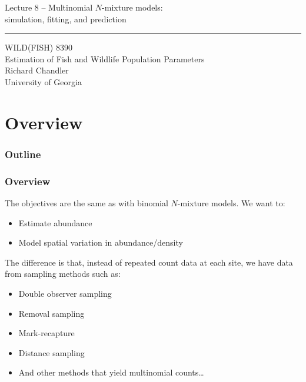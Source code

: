 \documentclass[color=usenames,dvipsnames]{beamer}\usepackage[]{graphicx}\usepackage[]{color}
\begin{document}
\begin{frame}[plain]
  \LARGE
  \centering
  {\LARGE Lecture 8 -- Multinomial $N$-mixture models: \\ simulation, fitting, and prediction} \\
  {\color{default} \rule{\textwidth}{0.1pt}}
  \vfill
  \large
  WILD(FISH) 8390 \\
  Estimation of Fish and Wildlife Population Parameters \\
  \vfill
  \large
  Richard Chandler \\
  University of Georgia \\
\end{frame}






\section{Overview}



\begin{frame}[plain]
  \frametitle{Outline}
  \Large
\end{frame}



\begin{frame}
  \frametitle{Overview}
  The objectives are the same as with binomial $N$-mixture models. %
  We want to:
  \begin{itemize}
    \item Estimate abundance
    \item Model spatial variation in abundance/density
  \end{itemize}
  \pause
  \vfill
  The difference is that, instead of repeated count data at each site,
  we have data from sampling methods such as:
  \begin{itemize}
    \item<2-> Double observer sampling
    \item<3-> Removal sampling
    \item<4-> Mark-recapture
    \item<5-> Distance sampling
    \item<6-> And other methods that yield multinomial counts\dots
  \end{itemize}
\end{frame}
\end{document}

